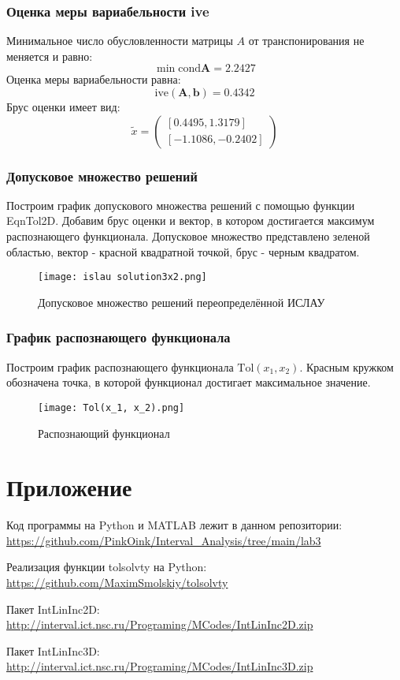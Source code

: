 \subsubsection{Оценка меры вариабельности ive}
Минимальное число обусловленности матрицы $A$ от транспонирования не меняется и равно:
\begin{equation}
	\min \text{cond} \textbf{A} = 2.2427
\end{equation}
Оценка меры вариабельности равна:
\begin{equation}
	\text{ive}(\textbf{A}, \textbf{b}) = 0.4342
\end{equation}
Брус оценки имеет вид:
\begin{equation}
	\tilde{x} =
	\begin{pmatrix}
		[0.4495, 1.3179] \\
		[-1.1086, -0.2402]
	\end{pmatrix}
\end{equation}

\subsubsection{Допусковое множество решений}
Построим график допускового множества решений с помощью функции EqnTol2D. Добавим брус оценки и вектор, в котором достигается максимум распознающего функционала. Допусковое множество представлено зеленой областью, вектор - красной квадратной точкой, брус - черным квадратом. \\
\newpage
\begin{figure}[h]
	\centering
	\texttt{[image: islau solution3x2.png]}
	\caption{Допусковое множество решений переопределённой ИСЛАУ}
\end{figure}

\subsubsection{График распознающего функционала}
Построим график распознающего функционала $\text{Tol}(x_1, x_2)$. Красным кружком обозначена точка, в которой функционал достигает максимальное значение. \\
\newpage
\begin{figure}[h]
	\centering
	\texttt{[image: Tol(x\_1, x\_2).png]}
	\caption{Распознающий функционал}
\end{figure}



\section{Приложение}
Код программы на Python и MATLAB лежит в данном репозитории: \\
\url{https://github.com/PinkOink/Interval_Analysis/tree/main/lab3}{}

Реализация функции tolsolvty на Python: \\
\url{https://github.com/MaximSmolskiy/tolsolvty}{}

Пакет IntLinInc2D: \\
\url{http://interval.ict.nsc.ru/Programing/MCodes/IntLinInc2D.zip}{}

Пакет IntLinInc3D: \\
\url{http://interval.ict.nsc.ru/Programing/MCodes/IntLinInc3D.zip}{}


